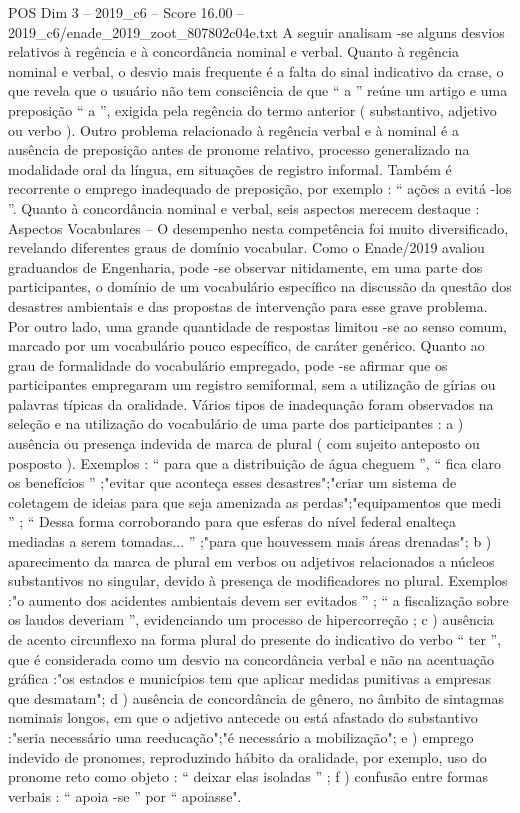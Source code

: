 \begin{textsample}{POS Dim 3 – 2019\_c6 – Score 16.00 – 2019\_c6/enade\_2019\_zoot\_807802c04e.txt}
A seguir analisam -se alguns desvios relativos à regência e à concordância nominal e verbal.
Quanto à regência nominal e verbal, o desvio mais frequente é a falta do sinal indicativo da crase, o que revela que o usuário não tem consciência de que “ a ” reúne um artigo e uma preposição “ a ”, exigida pela regência do termo anterior ( substantivo, adjetivo ou verbo ).
Outro problema relacionado à regência verbal e à nominal é a ausência de preposição antes de pronome relativo, processo generalizado na modalidade oral da língua, em situações de registro informal.
Também é recorrente o emprego inadequado de preposição, por exemplo : “ ações a evitá -los ”.
Quanto à concordância nominal e verbal, seis aspectos merecem destaque : Aspectos Vocabulares – O desempenho nesta competência foi muito diversificado, revelando diferentes graus de domínio vocabular.
Como o Enade/2019 avaliou graduandos de Engenharia, pode -se observar nitidamente, em uma parte dos participantes, o domínio de um vocabulário específico na discussão da questão dos desastres ambientais e das propostas de intervenção para esse grave problema.
Por outro lado, uma grande quantidade de respostas limitou -se ao senso comum, marcado por um vocabulário pouco específico, de caráter genérico.
Quanto ao grau de formalidade do vocabulário empregado, pode -se afirmar que os participantes empregaram um registro semiformal, sem a utilização de gírias ou palavras típicas da oralidade.
Vários tipos de inadequação foram observados na seleção e na utilização do vocabulário de uma parte dos participantes : a ) ausência ou presença indevida de marca de plural ( com sujeito anteposto ou posposto ).
Exemplos : “ para que a distribuição de água cheguem ”, “ fica claro os benefícios ” ;"evitar que aconteça esses desastres";"criar um sistema de coletagem de ideias para que seja amenizada as perdas";"equipamentos que medi ” ; “ Dessa forma corroborando para que esferas do nível federal enalteça mediadas a serem tomadas... ” ;"para que houvessem mais áreas drenadas"; b ) aparecimento da marca de plural em verbos ou adjetivos relacionados a núcleos substantivos no singular, devido à presença de modificadores no plural.
Exemplos :"o aumento dos acidentes ambientais devem ser evitados ” ; “ a fiscalização sobre os laudos deveriam ”, evidenciando um processo de hipercorreção ; c ) ausência de acento circunflexo na forma plural do presente do indicativo do verbo “ ter ”, que é considerada como um desvio na concordância verbal e não na acentuação gráfica :"os estados e municípios tem que aplicar medidas punitivas a empresas que desmatam"; d ) ausência de concordância de gênero, no âmbito de sintagmas nominais longos, em que o adjetivo antecede ou está afastado do substantivo :"seria necessário uma reeducação";"é necessário a mobilização"; e ) emprego indevido de pronomes, reproduzindo hábito da oralidade, por exemplo, uso do pronome reto como objeto : “ deixar elas isoladas ” ; f ) confusão entre formas verbais : “ apoia -se ” por “ apoiasse".

\end{textsample}

